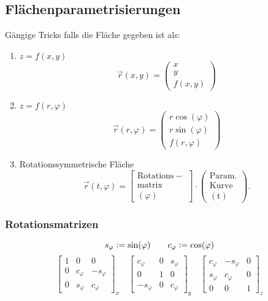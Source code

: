 \subsection{Flächenparametrisierungen}
Gängige Tricks falls die Fläche gegeben ist als:
    \begin{enumerate}
        \item $z = f(x,y)$
            $$
                \vec{r}(x,y) = \begin{pmatrix}
                    x\\y\\f(x,y)
                \end{pmatrix}
            $$
        \item $z = f(r,\varphi)$
            $$
                \vec{r}(r,\varphi) = \begin{pmatrix}
                    r\cos(\varphi)\\r\sin(\varphi)\\f(r,\varphi)
                \end{pmatrix}
            $$
        \item Rotationssymmetrische Fläche
            $$
                \vec{r}(t,\varphi) = \begin{bmatrix}
                    \mathrm{Rotations-}\\\mathrm{matrix}\\(\varphi)
                \end{bmatrix}
                \cdot
                \begin{pmatrix}
                    \mathrm{Param.}\\
                    \mathrm{Kurve}\\
                    \mathrm{(t)}
                \end{pmatrix}.
            $$
    \end{enumerate}
    \subsubsection{Rotationsmatrizen}
        \vspace{-1em}
        $$
        s_\varphi \vcentcolon= \sin(\varphi) \qquad c_\varphi \vcentcolon= \cos(\varphi)
        $$
        $$
        \begin{bmatrix}
            1 & 0 & 0\\
            0 & c_\varphi &-s_\varphi\\
            0 & s_\varphi & c_\varphi
        \end{bmatrix}_x
        \quad
        \begin{bmatrix}
            c_\varphi &0 & s_\varphi\\
            0 & 1 & 0\\
            -s_\varphi & 0 & c_\varphi
        \end{bmatrix}_y
        \quad\!
        \begin{bmatrix}
            c_\varphi &-s_\varphi& 0\\
            s_\varphi & c_\varphi& 0\\
            0 & 0 & 1
        \end{bmatrix}_z
        $$